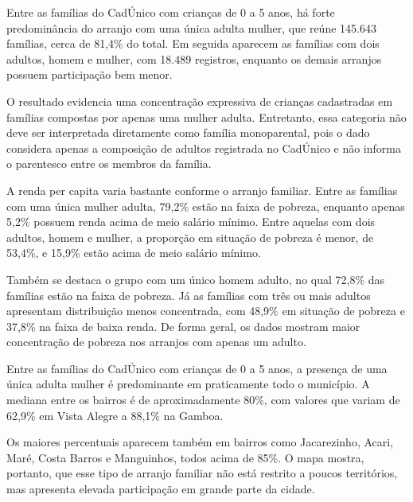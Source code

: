 Entre as famílias do CadÚnico com crianças de 0 a 5 anos, há forte predominância do arranjo com uma única adulta mulher, que reúne 145.643 famílias, cerca de 81,4\% do total. Em seguida aparecem as famílias com dois adultos, homem e mulher, com 18.489 registros, enquanto os demais arranjos possuem participação bem menor.

O resultado evidencia uma concentração expressiva de crianças cadastradas em famílias compostas por apenas uma mulher adulta. Entretanto, essa categoria não deve ser interpretada diretamente como família monoparental, pois o dado considera apenas a composição de adultos registrada no CadÚnico e não informa o parentesco entre os membros da família.


A renda per capita varia bastante conforme o arranjo familiar. Entre as famílias com uma única mulher adulta, 79,2\% estão na faixa de pobreza, enquanto apenas 5,2\% possuem renda acima de meio salário mínimo. Entre aquelas com dois adultos, homem e mulher, a proporção em situação de pobreza é menor, de 53,4\%, e 15,9\% estão acima de meio salário mínimo.

Também se destaca o grupo com um único homem adulto, no qual 72,8\% das famílias estão na faixa de pobreza. Já as famílias com três ou mais adultos apresentam distribuição menos concentrada, com 48,9\% em situação de pobreza e 37,8\% na faixa de baixa renda. De forma geral, os dados mostram maior concentração de pobreza nos arranjos com apenas um adulto.


Entre as famílias do CadÚnico com crianças de 0 a 5 anos, a presença de uma única adulta mulher é predominante em praticamente todo o município. A mediana entre os bairros é de aproximadamente 80\%, com valores que variam de 62,9\% em Vista Alegre a 88,1\% na Gamboa.

Os maiores percentuais aparecem também em bairros como Jacarezinho, Acari, Maré, Costa Barros e Manguinhos, todos acima de 85\%. O mapa mostra, portanto, que esse tipo de arranjo familiar não está restrito a poucos territórios, mas apresenta elevada participação em grande parte da cidade.

